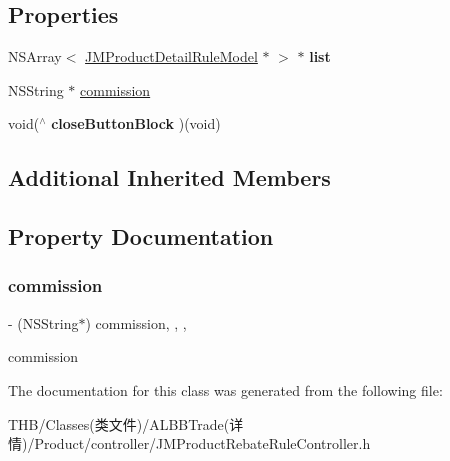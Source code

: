 \subsection*{Properties}
\begin{DoxyCompactItemize}
\item 
\mbox{\label{interface_j_m_product_rebate_rule_controller_aa482aca33243c08d6d22b8c791dd0fe9}} 
N\+S\+Array$<$ \mbox{\hyperlink{interface_j_m_product_detail_rule_model}{J\+M\+Product\+Detail\+Rule\+Model}} $\ast$ $>$ $\ast$ {\bfseries list}
\item 
N\+S\+String $\ast$ \mbox{\hyperlink{interface_j_m_product_rebate_rule_controller_adbbcabc1448a9b6501c79260b740e728}{commission}}
\item 
\mbox{\label{interface_j_m_product_rebate_rule_controller_ab0bc4b277e4176f2dc241ba03764f1aa}} 
void($^\wedge$ {\bfseries close\+Button\+Block} )(void)
\end{DoxyCompactItemize}
\subsection*{Additional Inherited Members}


\subsection{Property Documentation}
\mbox{\label{interface_j_m_product_rebate_rule_controller_adbbcabc1448a9b6501c79260b740e728}} 
\subsubsection{\texorpdfstring{commission}{commission}}
{\footnotesize\ttfamily -\/ (N\+S\+String$\ast$) commission\hspace{0.3cm}{\ttfamily [read]}, {\ttfamily [write]}, {\ttfamily [nonatomic]}, {\ttfamily [copy]}}

commission 

The documentation for this class was generated from the following file\+:\begin{DoxyCompactItemize}
\item 
T\+H\+B/\+Classes(类文件)/\+A\+L\+B\+B\+Trade(详情)/\+Product/controller/J\+M\+Product\+Rebate\+Rule\+Controller.\+h\end{DoxyCompactItemize}
